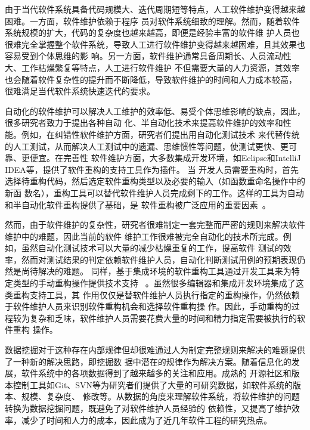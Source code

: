 由于当代软件系统具备代码规模大、迭代周期短等特点，人工软件维护变得越来越困难。一方面，软件维护依赖于程序
员对软件系统细致的理解。然而，随着软件系统规模的扩大，代码的复杂度也越来越高，即便是经验丰富的软件维
护人员也很难完全掌握整个软件系统，导致人工进行软件维护变得越来越困难，且其效果也容易受到个体思维的影
响。另一方面，软件维护通常具备周期长、人员流动性大、工作枯燥繁复等特点，人工进行软件维护
不但需要大量的人力资源，其效率也会随着软件复杂性的提升而不断降低，导致软件维护的时间和人力成本较高，
很难满足当代软件系统快速迭代的要求。

自动化的软件维护可以解决人工维护的效率低、易受个体思维影响的缺点，因此，很多研究者致力于提出各种自动
化、半自动化技术来提高软件维护的效率和性能。例如，在纠错性软件维护方面，研究者们提出用自动化测试技术
来代替传统的人工测试，从而解决人工测试中的遗漏、思维惯性等问题，使测试更快、更可靠、更便宜。在完善性
软件维护方面，大多数集成开发环境，如Eclipse和IntelliJ IDEA等，提供了软件重构的支持工具作为插件。 当
开发人员需要重构时，首先选择待重构代码，然后选定软件重构类型以及必要的输入（如函数重命名操作中的新函
数名），重构工具可以替代软件维护人员完成剩下的工作。这样的工具为自动和半自动化软件重构提供了基础，是
软件重构被广泛应用的重要因素~\cite{griswold1993automated,tip2003refactoring,mens2005formalizing}。

然而，由于软件维护的复杂性，研究者很难制定一套完整而严密的规则来解决软件维护中的难题，因此当前的软件
维护工作很难被完全自动化的技术所完成。例如，虽然自动化测试技术可以大量的减少枯燥重复的工作，提高软件
测试的效率，然而对测试结果的判定依赖软件维护人员，自动化判断测试用例的预期表现仍然是尚待解决的难题。
同样，基于集成环境的软件重构工具通过开发工具来为特定类型的手动重构操作提供技术支持
~\cite{fowler1999refactoring, murphy2012we}。虽然很多编辑器和集成开发环境集成了这类重构支持工具，其
作用仅仅是替软件维护人员执行指定的重构操作，仍然依赖于软件维护人员来识别软件重构机会和选择软件重构操
作。因此，手动重构的过程较为复杂和乏味，软件维护人员需要花费大量的时间和精力指定需要被执行的软件重构
操作。

数据挖掘对于这种存在内部规律但却很难通过人为制定完整规则来解决的难题提供了一种新的解决思路，即挖掘数
据中潜在的规律作为解决方案。随着信息化的发展，软件系统中的各项数据得到了越来越多的关注和应用。成熟的
开源社区和版本控制工具如Git、SVN等为研究者们提供了大量的可研究数据，如软件系统的版本、规模、复杂度、
修改等。从数据的角度来理解软件系统，将软件维护的问题转换为数据挖掘问题，既避免了对软件维护人员经验的
依赖性，又提高了维护效率，减少了时间和人力的成本，因此成为了近几年软件工程的研究热点。



